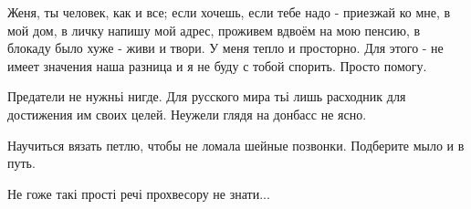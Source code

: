 \begin{itemize}

Женя, ты человек, как и все; если хочешь, если тебе надо - приезжай ко мне, в
мой дом, в личку напишу мой адрес, проживем вдвоём на мою пенсию, в блокаду
было хуже - живи и твори. У меня тепло и просторно. Для этого - не имеет
значения наша разница и я не буду с тобой спорить. Просто помогу.


Предатели не нужньі нигде. Для русского мира тьі лишь расходник для достижения
им своих целей.  Неужели глядя на донбасс не ясно.

Научиться вязать петлю, чтобы не ломала шейные позвонки. Подберите мыло и в путь.

Не гоже такі прості речі прохвесору не знати...


\end{itemize} %
